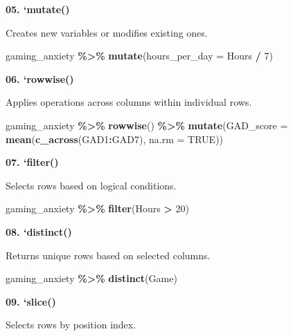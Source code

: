 \documentclass[
]{book}
\newenvironment{Shaded}{\begin{snugshade}}{\end{snugshade}}
\newcommand{\AttributeTok}[1]{\textcolor[rgb]{0.13,0.29,0.53}{#1}}
\newcommand{\ConstantTok}[1]{\textcolor[rgb]{0.56,0.35,0.01}{#1}}
\newcommand{\DecValTok}[1]{\textcolor[rgb]{0.00,0.00,0.81}{#1}}
\newcommand{\FunctionTok}[1]{\textcolor[rgb]{0.13,0.29,0.53}{\textbf{#1}}}
\newcommand{\NormalTok}[1]{#1}
\newcommand{\SpecialCharTok}[1]{\textcolor[rgb]{0.81,0.36,0.00}{\textbf{#1}}}
\begin{document}
\textbf{05. `mutate()}

Creates new variables or modifies existing ones.

\begin{Shaded}
\begin{Highlighting}[]
\NormalTok{gaming\_anxiety }\SpecialCharTok{\%\textgreater{}\%}
  \FunctionTok{mutate}\NormalTok{(}\AttributeTok{hours\_per\_day =}\NormalTok{ Hours }\SpecialCharTok{/} \DecValTok{7}\NormalTok{)}
\end{Highlighting}
\end{Shaded}

\textbf{06. `rowwise()}

Applies operations across columns within individual rows.

\begin{Shaded}
\begin{Highlighting}[]
\NormalTok{gaming\_anxiety }\SpecialCharTok{\%\textgreater{}\%}
  \FunctionTok{rowwise}\NormalTok{() }\SpecialCharTok{\%\textgreater{}\%}
  \FunctionTok{mutate}\NormalTok{(}\AttributeTok{GAD\_score =} \FunctionTok{mean}\NormalTok{(}\FunctionTok{c\_across}\NormalTok{(GAD1}\SpecialCharTok{:}\NormalTok{GAD7), }\AttributeTok{na.rm =} \ConstantTok{TRUE}\NormalTok{))}
\end{Highlighting}
\end{Shaded}

\textbf{07. `filter()}

Selects rows based on logical conditions.

\begin{Shaded}
\begin{Highlighting}[]
\NormalTok{gaming\_anxiety }\SpecialCharTok{\%\textgreater{}\%}
  \FunctionTok{filter}\NormalTok{(Hours }\SpecialCharTok{\textgreater{}} \DecValTok{20}\NormalTok{)}
\end{Highlighting}
\end{Shaded}

\textbf{08. `distinct()}

Returns unique rows based on selected columns.

\begin{Shaded}
\begin{Highlighting}[]
\NormalTok{gaming\_anxiety }\SpecialCharTok{\%\textgreater{}\%}
  \FunctionTok{distinct}\NormalTok{(Game)}
\end{Highlighting}
\end{Shaded}

\textbf{09. `slice()}

Selects rows by position index.
\end{document}
